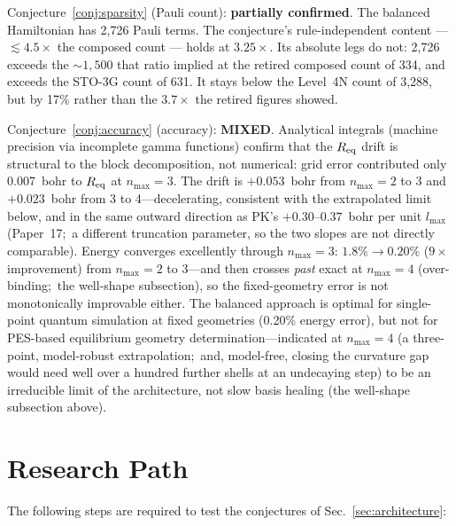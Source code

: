 \documentclass[aps,pra,twocolumn,superscriptaddress,longbibliography]{revtex4-2}
\begin{document}
Conjecture~\ref{conj:sparsity} (Pauli count): \textbf{partially confirmed}.
The balanced Hamiltonian has 2{,}726 Pauli terms.  The conjecture's
rule-independent content --- $\lesssim 4.5\times$ the composed count
--- holds at $3.25\times$.  Its absolute legs do not: 2{,}726 exceeds
the ${\sim}1{,}500$ that ratio implied at the retired composed count
of 334, and exceeds the STO-3G count of 631.  It stays below the
Level~4N count of 3{,}288, but by 17\% rather than the $3.7\times$
the retired figures showed.

Conjecture~\ref{conj:accuracy} (accuracy): \textbf{MIXED}.  Analytical
integrals (machine precision via incomplete gamma functions) confirm that
the $R_{\rm eq}$ drift is structural to the block decomposition, not
numerical: grid error contributed only 0.007~bohr to $R_{\rm eq}$ at
$n_{\max} = 3$.  The drift is $+0.053$~bohr from $n_{\max}=2$ to 3 and $+0.023$~bohr
from 3 to 4---decelerating, consistent with the extrapolated limit below,
and in the same outward direction as PK's $+0.30$--$0.37$~bohr per unit
$l_{\max}$ (Paper~17;\ a different truncation parameter, so the two slopes
are not directly comparable).  Energy converges excellently through
$n_{\max}=3$: $1.8\% \to 0.20\%$ ($9\times$ improvement) from $n_{\max} = 2$
to 3---and then crosses \emph{past} exact at $n_{\max}=4$ (over-binding;\ the
well-shape subsection), so the fixed-geometry error is not monotonically
improvable either.
The balanced approach is optimal for single-point quantum simulation at
fixed geometries (0.20\% energy error), but not for PES-based equilibrium
geometry determination---indicated at $n_{\max}=4$ (a three-point,
model-robust extrapolation;\ and, model-free, closing the curvature gap would
need well over a hundred further shells at an undecaying step) to be an
irreducible limit of the architecture, not slow basis healing (the well-shape
subsection above).


\section{Research Path}
\label{sec:path}

The following steps are required to test the conjectures of
Sec.~\ref{sec:architecture}:
\end{document}
